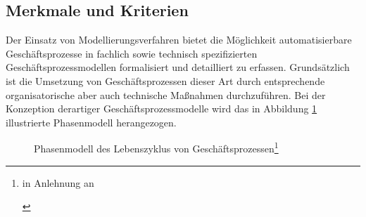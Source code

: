 \subsection{Merkmale und Kriterien}

Der Einsatz von Modellierungsverfahren bietet die Möglichkeit automatisierbare Geschäftsprozesse in fachlich sowie technisch spezifizierten Geschäftsprozessmodellen formalisiert und detailliert zu erfassen.
Grundsätzlich ist die Umsetzung von Geschäftsprozessen dieser Art durch entsprechende organisatorische aber auch technische Maßnahmen durchzuführen.
Bei der Konzeption derartiger Geschäftsprozessmodelle wird das in Abbildung \ref{fig:Phasenmodell bei der Automatisierung von Geschäftsprozessen} illustrierte Phasenmodell herangezogen.

\begin{figure}[H]
	\centering 
    \caption[Phasenmodell bei der Automatisierung von Geschäftsprozessen]
    {Phasenmodell des Lebenszyklus von Geschäftsprozessen\footnote{in Anlehnung an \author{Scheer.1991} \citeyear{Scheer.1991} \cite{Scheer.1991}} }
    \label{fig:Phasenmodell bei der Automatisierung von Geschäftsprozessen}
\end{figure}

